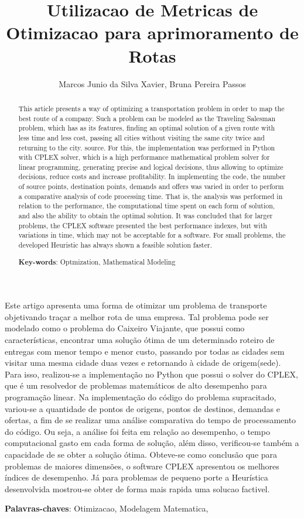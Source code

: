 \documentclass[12pt]{article}
\title{Utilizacao de Metricas de Otimizacao para aprimoramento de Rotas}
\author{Marcos Junio da Silva Xavier, Bruna Pereira Passos}
\begin{document}
 
\maketitle
\begin{resumo} 
Este artigo apresenta uma forma de otimizar um problema de transporte objetivando traçar a melhor rota de uma empresa. Tal problema pode ser modelado como o problema do Caixeiro Viajante, que possui como características, encontrar uma solução ótima de um determinado roteiro de entregas com menor tempo e menor custo, passando por todas as cidades sem visitar uma mesma cidade duas vezes e retornando à cidade de origem(sede). Para isso, realizou-se a implementação no Python que possui o solver do CPLEX, que é um resolvedor de problemas matemáticos de alto desempenho para programação linear.
Na implementação do código do problema supracitado, variou-se a quantidade de pontos de origens, pontos de destinos, demandas e ofertas, a fim de se realizar uma análise comparativa do tempo de processamento do código.  Ou seja, a análise foi feita em relação ao desempenho, o tempo computacional gasto em cada forma de solução, além disso, verificou-se também a capacidade de se obter a solução ótima.
Obteve-se como conclusão que para problemas de maiores dimensões, o software CPLEX apresentou os melhores índices de desempenho. Já para problemas de pequeno porte a Heurística desenvolvida mostrou-se obter de forma mais rapida uma solucao factivel.

\vspace{\onelineskip}
\noindent
\textbf{Palavras-chaves}: Otimizacao, Modelagem Matematica,
\end{resumo}
\begin{abstract}This article presents a way of optimizing a transportation problem in order to map the best route of a company. Such a problem can be modeled as the Traveling Salesman problem, which has as its features, finding an optimal solution of a given route with less time and less cost, passing all cities without visiting the same city twice and returning to the city. source. For this, the implementation was performed in Python with CPLEX solver, which is a high performance mathematical problem solver for linear programming, generating precise and logical decisions, thus allowing to optimize decisions, reduce costs and increase profitability. In implementing the code, the number of source points, destination points, demands and offers was varied in order to perform a comparative analysis of code processing time. That is, the analysis was performed in relation to the performance, the computational time spent on each form of solution, and also the ability to obtain the optimal solution. It was concluded that for larger problems, the CPLEX software presented the best performance indexes, but with variations in time, which may not be acceptable for a software. For small problems, the developed Heuristic has always shown a feasible solution faster.

\vspace{\onelineskip}
\noindent
\textbf{Key-words}: Optmization, Mathematical Modeling
\end{abstract}
     
\end{document}
